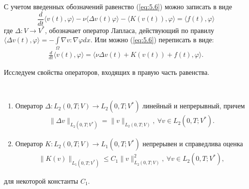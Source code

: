 С учетом введенных обозначений равенство (\ref{eq:5.6}) можно записать в виде
$$\frac{d}{dt} \langle v(t),\varphi \rangle - \nu\langle \Delta v(t) \varphi \rangle -
\langle K(v(t)),\varphi \rangle = \langle f(t),\varphi \rangle $$
где $\Delta: V \rightarrow V^\ast$, обозначает оператор Лапласа, действующий по правилу
$\langle \Delta v(t),\varphi \rangle=-\int\limits_\Omega \nabla v:\nabla\varphi dx.$
Или можно (\ref{eq:5.6}) переписать в виде:
\begin{equation}\label{eq:5.8}
    \begin{gathered}
        \frac{d}{dt} \langle v(t),\varphi \rangle = \langle \nu\Delta v(t)+K(v(t))+f(t),\varphi \rangle.
    \end{gathered}
\end{equation}

Исследуем свойства операторов, входящих в правую часть равенства.
\begin{lemma} ~\\
    \begin{enumerate}
        \item Оператор $\Delta: L_2(0, T; V) \rightarrow L_2(0, T; V^\ast)$ линейный и\linebreak
        непрерывный, причем
        \begin{equation}\label{eq:5.9}
            \begin{gathered}
                \| \Delta v \|_{L_2(0, T; V^\ast)} = \| v \|_{L_2(0, T; V)}, \ \forall v \in L_2(0, T; V^\ast).
            \end{gathered}
        \end{equation}
        \item Оператор $K: L_2(0, T; V) \rightarrow L_1(0, T; V^\ast)$ непрерывен и справедлива оценка
        \begin{equation}\label{eq:5.10}
            \begin{gathered}
                \| K(v) \|_{L_1(0, T; V^\ast)} \leqslant C_1\| v \|^2_{L_2(0, T;V)}, \ \forall v \in L_2(0, T; V^\ast),
            \end{gathered}
        \end{equation}
    \end{enumerate}
    для некоторой константы $C_1$.
\end{lemma}

